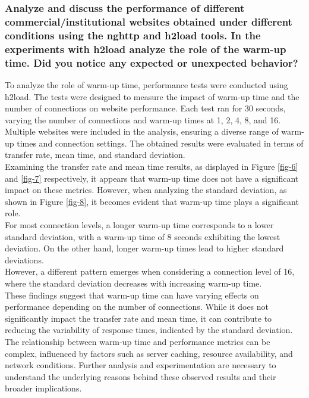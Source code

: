 \documentclass[eng]{class}
\begin{document}
\subsubsection*{Analyze and discuss the performance of different commercial/institutional websites obtained
  under different conditions using the nghttp and h2load tools. In the experiments with
  h2load analyze the role of the warm-up time. Did you notice any expected or unexpected
  behavior?}
To analyze the role of warm-up time, performance tests were conducted using h2load.
The tests were designed to measure the impact of warm-up time and the number of connections on website performance.
Each test ran for 30 seconds, varying the number of connections and warm-up times at 1, 2, 4, 8, and 16.\\
Multiple websites were included in the analysis, ensuring a diverse range of warm-up times and connection settings.
The obtained results were evaluated in terms of transfer rate, mean time, and standard deviation.\\
Examining the transfer rate and mean time results, as displayed in Figure \ref{fig-6} and \ref{fig-7} respectively,
it appears that warm-up time does not have a significant impact on these metrics.
However, when analyzing the standard deviation, as shown in Figure \ref{fig-8}, it becomes evident that warm-up time plays a significant role.\\
For most connection levels, a longer warm-up time corresponds to a lower standard deviation, with a warm-up time of 8 seconds exhibiting the lowest deviation.
On the other hand, longer warm-up times lead to higher standard deviations. \\
However, a different pattern emerges when considering a connection level of 16, where the standard deviation decreases with increasing warm-up time.\\
These findings suggest that warm-up time can have varying effects on performance depending on the number of connections.
While it does not significantly impact the transfer rate and mean time, it can contribute to reducing the variability of response times,
indicated by the standard deviation. The relationship between warm-up time and performance metrics can be complex,
influenced by factors such as server caching, resource availability, and network conditions.
Further analysis and experimentation are necessary to understand the underlying reasons behind these observed results and their broader implications.
\end{document}
